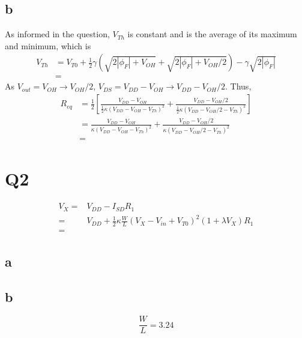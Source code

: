 \documentclass[a4paper,10pt]{article}
\begin{document}
\subsection*{b}
As informed in the question, \begin{math}V_{Th}\end{math} is constant and is the average of its maximum and minimum, which is
\begin{equation}
\begin{split}
V_{Th} &= V_{T0} + \frac{1}{2}\gamma(\sqrt{2|\phi_F| + V_{OH}} + \sqrt{2|\phi_F| + V_{OH}/2}) -\gamma\sqrt{2|\phi_F|}\\
&=
\end{split}
\end{equation}
As \begin{math}V_{out} = V_{OH} \rightarrow V_{OH}/2\end{math}, \begin{math}V_{DS} = V_{DD} - V_{OH} \rightarrow V_{DD} -
V_{OH}/2\end{math}. Thus,
\begin{equation}
\begin{split}
R_{eq} &= \frac{1}{2}\left[ \frac{V_{DD} - V_{OH}}{\frac{1}{2}\kappa(V_{DD}-V_{OH}-V_{Th}) ^2} + \frac{V_{DD} - V_{OH}/2}{\frac{1}{2}\kappa(V_{DD}-V_{OH}/2-V_{Th}) ^2}\right]\\
&= \frac{V_{DD} - V_{OH}}{\kappa(V_{DD}-V_{OH}-V_{Th}) ^2} + \frac{V_{DD} - V_{OH}/2}{\kappa(V_{DD}-V_{OH}/2-V_{Th}) ^2}\\
&=
\end{split}
\end{equation}

\section*{Q2}
\begin{equation}
\begin{split}
V_X =& V_{DD} - I_{SD}R_1\\
=& V_{DD} + \frac{1}{2}\kappa\frac{W}{L}(V_X-V_{in}+V_{T0})^2 (1+\lambda V_X)R_1\\
=& 
\end{split}
\end{equation}
\subsection*{a}
\subsection*{b}
\begin{equation}
\frac{W}{L} = 3.24
\end{equation}
\end{document}
